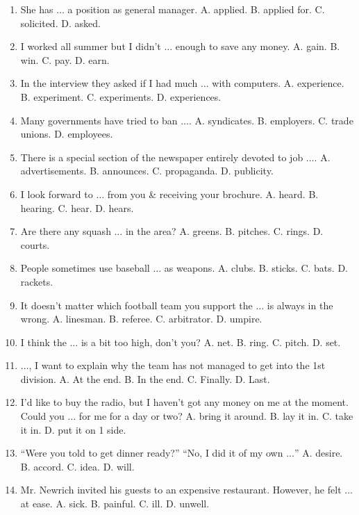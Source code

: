 \documentclass{article}
\numberwithin{equation}{section}
\begin{document}
\begin{enumerate}[leftmargin=2mm]
	\item She has $\ldots$ a position as general manager. {\sf A.} applied. {\sf B.} applied for. {\sf C.} solicited. {\sf D.} asked.
	\item I worked all summer but I didn't $\ldots$ enough to save any money. {\sf A.} gain. {\sf B.} win. {\sf C.} pay. {\sf D.} earn.
	\item In the interview they asked if I had much $\ldots$ with computers. {\sf A.} experience. {\sf B.} experiment. {\sf C.} experiments. {\sf D.} experiences.
	\item Many governments have tried to ban $\ldots$. {\sf A.} syndicates. {\sf B.} employers. {\sf C.} trade unions. {\sf D.} employees.
	\item There is a special section of the newspaper entirely devoted to job $\ldots$. {\sf A.} advertisements. {\sf B.} announces. {\sf C.} propaganda. {\sf D.} publicity.
	\item I look forward to $\ldots$ from you \& receiving your brochure. {\sf A.} heard. {\sf B.} hearing. {\sf C.} hear. {\sf D.} hears.
	\item Are there any squash $\ldots$ in the area? {\sf A.} greens. {\sf B.} pitches. {\sf C.} rings. {\sf D.} courts.
	\item People sometimes use baseball $\ldots$ as weapons. {\sf A.} clubs. {\sf B.} sticks. {\sf C.} bats. {\sf D.} rackets.
	\item It doesn't matter which football team you support the $\ldots$ is always in the wrong. {\sf A.} linesman. {\sf B.} referee. {\sf C.} arbitrator. {\sf D.} umpire.
	\item I think the $\ldots$ is a bit too high, don't you? {\sf A.} net. {\sf B.} ring. {\sf C.} pitch. {\sf D.} set.
	\item $\ldots$, I want to explain why the team has not managed to get into the 1st division. {\sf A.} At the end. {\sf B.} In the end. {\sf C.} Finally. {\sf D.} Last.
	\item I'd like to buy the radio, but I haven't got any money on me at the moment. Could you $\ldots$ for me for a day or two? {\sf A.} bring it around. {\sf B.} lay it in. {\sf C.} take it in. {\sf D.} put it on 1 side.
	\item ``Were you told to get dinner ready?'' ``No, I did it of my own $\ldots$'' {\sf A.} desire. {\sf B.} accord. {\sf C.} idea. {\sf D.} will.
	\item Mr. Newrich invited his guests to an expensive restaurant. However, he felt $\ldots$ at ease. {\sf A.} sick. {\sf B.} painful. {\sf C.} ill. {\sf D.} unwell.

\end{enumerate}
\end{document}
